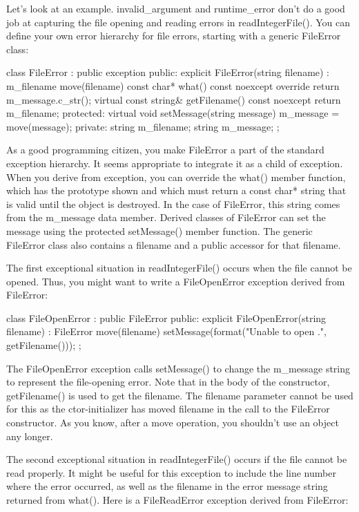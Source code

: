 Let’s look at an example. invalid\_argument and runtime\_error don’t do a good job at capturing the file opening and reading errors in readIntegerFile(). You can define your own error hierarchy for file errors, starting with a generic FileError class:

\begin{cpp}
class FileError : public exception
{
    public:
        explicit FileError(string filename) : m_filename { move(filename) } {}
        const char* what() const noexcept override { return m_message.c_str(); }
        virtual const string& getFilename() const noexcept { return m_filename; }
    protected:
        virtual void setMessage(string message) { m_message = move(message); }
    private:
        string m_filename;
        string m_message;
};
\end{cpp}

As a good programming citizen, you make FileError a part of the standard exception hierarchy. It seems appropriate to integrate it as a child of exception. When you derive from exception, you can override the what() member function, which has the prototype shown and which must return a const char* string that is valid until the object is destroyed. In the case of FileError, this string comes from the m\_message data member. Derived classes of FileError can set the message using the protected setMessage() member function. The generic FileError class also contains a filename and a public accessor for that filename.

The first exceptional situation in readIntegerFile() occurs when the file cannot be opened. Thus, you might want to write a FileOpenError exception derived from FileError:

\begin{cpp}
class FileOpenError : public FileError
{
    public:
    explicit FileOpenError(string filename) : FileError { move(filename) }
    {
        setMessage(format("Unable to open {}.", getFilename()));
    }
};
\end{cpp}

The FileOpenError exception calls setMessage() to change the m\_message string to represent the file-opening error. Note that in the body of the constructor, getFilename() is used to get the filename. The filename parameter cannot be used for this as the ctor-initializer has moved filename in the call to the FileError constructor. As you know, after a move operation, you shouldn’t use an object any longer.

The second exceptional situation in readIntegerFile() occurs if the file cannot be read properly. It might be useful for this exception to include the line number where the error occurred, as well as the filename in the error message string returned from what(). Here is a FileReadError exception derived from FileError:

